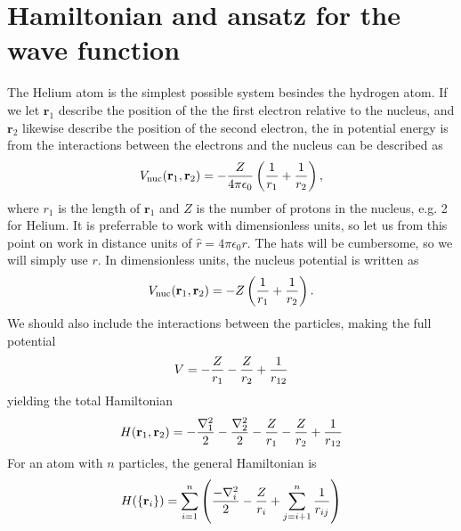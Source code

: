 \documentclass[aps,prc,twocolumn,floatfix]{revtex4}
\def\rvec{\textbf{r}}
\begin{document}
\section{Hamiltonian and ansatz for the wave function}
\label{sec:ansatz}
 The Helium atom is the simplest possible system besindes the hydrogen atom. If we let $\rvec_1$ describe the position of the the first electron relative to the nucleus, and $\rvec_2$ likewise describe the position of the second electron, the in potential energy is from the interactions between the electrons and the nucleus can be described as
 \begin{equation}
  V_{\rm nuc}(\rvec_1, \rvec_2) = -{Z \over 4 \pi \epsilon_0}\left( {1 \over r_1} + {1 \over r_2} \right),
 \end{equation}
where $r_1$ is the length of $\rvec_1$ and $Z$ is the number of protons in the nucleus, e.g. 2 for Helium. It is preferrable to work with dimensionless units, so let us from this point on work in distance units of $\hat{r} = 4\pi \epsilon_0 r$. The hats will be cumbersome, so we will simply use $r$. In dimensionless units, the nucleus potential is written as 
\begin{equation}
 V_{\rm nuc}(\rvec_1, \rvec_2) = -Z\left( {1 \over r_1} + {1 \over r_2} \right).
\end{equation}
We should also include the interactions between the particles, making the full potential 
\begin{equation}
 V = -{Z \over r_1} - {Z \over r_2} + {1 \over r_{12}}
\end{equation}
yielding the total Hamiltonian 
\begin{equation}
 H(\rvec_1, \rvec_2) = -{\nabla^2_1 \over 2} -{\nabla^2_2 \over 2}-{Z \over r_1} - {Z \over r_2} + {1 \over r_{12}}
\end{equation}
For an atom with $n$ particles, the general Hamiltonian is
\begin{equation}
 H(\{ \rvec_i \}) = \sum_{i=1}^n \left( {-\nabla_i^2 \over 2} - {Z \over r_i} + \sum_{j=i+1}^n {1 \over r_{ij}} \right)
\end{equation}
\end{document}
